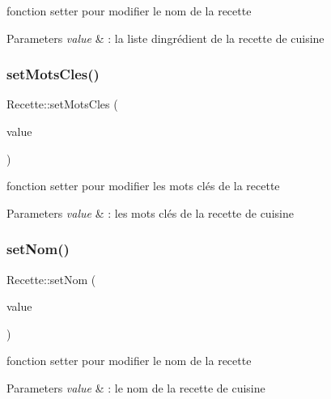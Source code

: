 fonction setter pour modifier le nom de la recette 


\begin{DoxyParams}{Parameters}
{\em value} & \+: la liste d\textquotesingle{}ingrédient de la recette de cuisine \\
\hline
\end{DoxyParams}
\mbox{\label{classRecette_a7ccd5aeac86f8ba49831a5ec7d7ad275}} 
\subsubsection{\texorpdfstring{set\+Mots\+Cles()}{setMotsCles()}}
{\footnotesize\ttfamily Recette\+::set\+Mots\+Cles (\begin{DoxyParamCaption}\item[{const Q\+String \&}]{value }\end{DoxyParamCaption})}



fonction setter pour modifier les mots clés de la recette 


\begin{DoxyParams}{Parameters}
{\em value} & \+: les mots clés de la recette de cuisine \\
\hline
\end{DoxyParams}
\mbox{\label{classRecette_a8c5387d06e11ecfaf827142146ca0b08}} 
\subsubsection{\texorpdfstring{set\+Nom()}{setNom()}}
{\footnotesize\ttfamily Recette\+::set\+Nom (\begin{DoxyParamCaption}\item[{const Q\+String \&}]{value }\end{DoxyParamCaption})}



fonction setter pour modifier le nom de la recette 


\begin{DoxyParams}{Parameters}
{\em value} & \+: le nom de la recette de cuisine \\
\hline
\end{DoxyParams}
\mbox{\label{classRecette_ad23ff518166fa2616c64c94e427cd32b}} 

